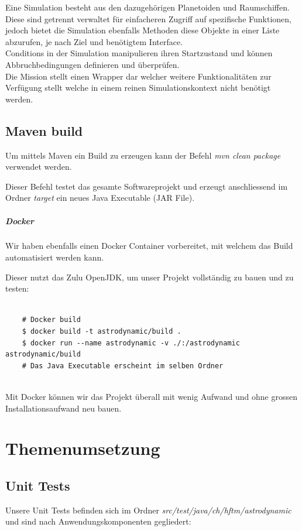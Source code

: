 Eine Simulation besteht aus den dazugehörigen Planetoiden und Raumschiffen. Diese sind getrennt verwaltet für einfacheren Zugriff auf spezifische Funktionen, jedoch bietet die Simulation ebenfalls Methoden diese Objekte in einer Liste abzurufen, je nach Ziel und benötigtem Interface.\\
Conditions in der Simulation manipulieren ihren Startzustand und können Abbruchbedingungen definieren und überprüfen.\\
Die Mission stellt einen Wrapper dar welcher weitere Funktionalitäten zur Verfügung stellt welche in einem reinen Simulationskontext nicht benötigt werden.

\subsection{Maven build}

Um mittels Maven ein Build zu erzeugen kann der Befehl \textit{mvn clean package} verwendet werden.

Dieser Befehl testet das gesamte Softwareprojekt und erzeugt anschliessend im Ordner \textit{target} ein neues Java Executable (JAR File).

\subparagraph{Docker}

Wir haben ebenfalls einen Docker Container vorbereitet, mit welchem das Build automatisiert werden kann.

Dieser nutzt das Zulu OpenJDK, um unser Projekt vollständig zu bauen und zu testen:

\begin{lstlisting}

	# Docker build
	$ docker build -t astrodynamic/build .
	$ docker run --name astrodynamic -v ./:/astrodynamic astrodynamic/build
	# Das Java Executable erscheint im selben Ordner
	
\end{lstlisting}

Mit Docker können wir das Projekt überall mit wenig Aufwand und ohne grossen Installationsaufwand neu bauen.

\section{Themenumsetzung}

\subsection{Unit Tests}

Unsere Unit Tests befinden sich im Ordner \textit{src/test/java/ch/hftm/astrodynamic} und sind nach Anwendungskomponenten gegliedert:

